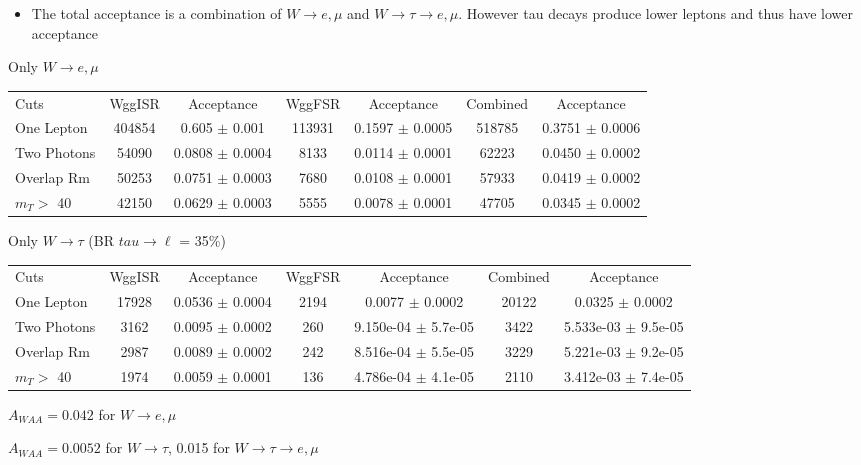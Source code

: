 \documentclass{beamer}
\begin{document}
 {

    \begin{itemize}
        \item The total acceptance is a combination of $W\to e, \mu$ and $W\to \tau \to e, \mu$.  However
          tau decays produce lower \pt leptons and thus have lower acceptance
    \end{itemize}


        
    Only $W\to e, \mu$

    \vspace{2mm}

    \tiny
    \begin{tabular}{| l | c | c | c | c | c | c | }
    Cuts         & WggISR            & Acceptance           & WggFSR            & Acceptance           & Combined          & Acceptance \\ 
    One Lepton   & 404854  & 0.605 $\pm$ 0.001    & 113931  & 0.1597 $\pm$ 0.0005  & 518785  & 0.3751 $\pm$ 0.0006 \\ 
    Two Photons  & 54090   & 0.0808 $\pm$ 0.0004  & 8133    & 0.0114 $\pm$ 0.0001  & 62223   & 0.0450 $\pm$ 0.0002 \\ 
    Overlap Rm   & 50253   & 0.0751 $\pm$ 0.0003  & 7680    & 0.0108 $\pm$ 0.0001  & 57933   & 0.0419 $\pm$ 0.0002 \\ 
    $m_{T} >$ 40 & 42150   & 0.0629 $\pm$ 0.0003  & 5555    & 0.0078 $\pm$ 0.0001  & 47705   & 0.0345 $\pm$ 0.0002 \\ 
     \end{tabular}

    \vspace{2mm}


    \normalsize
    Only $W\to \tau$ (BR $tau\to \ell$ = 35\%)

    \vspace{2mm}

    \tiny

    \begin{tabular}{| l | c | c | c | c | c | c | }
    Cuts         & WggISR           & Acceptance           & WggFSR         & Acceptance               & Combined         & Acceptance \\ 
    One Lepton   & 17928   & 0.0536 $\pm$ 0.0004  & 2194  & 0.0077 $\pm$ 0.0002      & 20122 & 0.0325 $\pm$ 0.0002 \\ 
    Two Photons  & 3162    & 0.0095 $\pm$ 0.0002  & 260   & 9.150e-04 $\pm$ 5.7e-05  & 3422  & 5.533e-03 $\pm$ 9.5e-05 \\ 
    Overlap Rm   & 2987    & 0.0089 $\pm$ 0.0002  & 242   & 8.516e-04 $\pm$ 5.5e-05  & 3229  & 5.221e-03 $\pm$ 9.2e-05 \\ 
    $m_{T} >$ 40 & 1974    & 0.0059 $\pm$ 0.0001  & 136   & 4.786e-04 $\pm$ 4.1e-05  & 2110  & 3.412e-03 $\pm$ 7.4e-05 \\ 
     \end{tabular}

    \begin{center}
        \large
        $A_{WAA} = 0.042$ for $W\to e, \mu$

        $A_{WAA} = 0.0052$ for $W\to \tau$, 0.015 for $W\to \tau \to e, \mu$
    \end{center}
}
\end{document}
